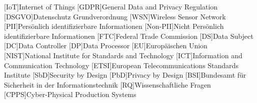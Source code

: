 

\begin{acronym}[DSGVO]

[IoT]{Internet of Things}
[GDPR]{General Data and Privacy Regulation}
[DSGVO]{Datenschutz Grundverordnung}
[WSN]{Wireless Sensor Network}
[PII]{Persönlich identifizierbare Informationen}
[Non-PII]{Nicht Persönlich identifizierbare Informationen}
[FTC]{Federal Trade Commission}
[DS]{Data Subject}
[DC]{Data Controller}
[DP]{Data Processor}
[EU]{Europäischen Union}
[NIST]{National Institute for Standards and Technology}
[ICT]{Information and Communication Technology}
[ETSI]{European Telecommunications Standards Institute}
[SbD]{Security by Design}
[PbD]{Privacy by Design}
[BSI]{Bundesamt für Sicherheit in der Informationstechnik}
[RQ]{Wissenschaftliche Fragen}
[CPPS]{Cyber-Physical Production Systems}

\end{acronym}